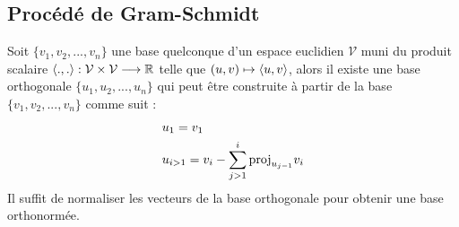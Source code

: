 	\subsection{Procédé de Gram-Schmidt}
		\begin{myprop}
			Soit $\{v_1,v_2,...,v_n\}$ une base quelconque d'un espace euclidien $\mathcal{V}$ muni du produit scalaire $\langle .,.\rangle:\mathcal{V}\times\mathcal{V}\longrightarrow\mathbb{R}$ telle que $(u,v)\mapsto\langle u,v\rangle$, alors il existe une base orthogonale $\{u_1,u_2,...,u_n\}$ qui peut être construite à partir de la base $\{v_1,v_2,...,v_n\}$ comme suit :
			\begin{align*}
				&u_1 = v_1\\
				&u_{i>1}=v_i-\sum_{j>1}^{i}\text{\normalfont{proj}}_{u_{j-1}} v_i
			\end{align*} 
			Il suffit de normaliser les vecteurs de la base orthogonale pour obtenir une base orthonormée. 
		\end{myprop}

